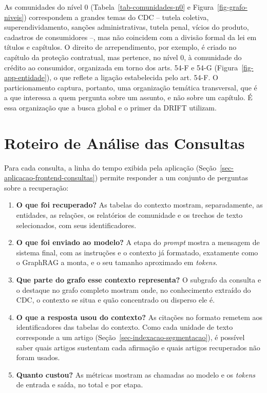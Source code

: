 As comunidades do nível 0 (Tabela~\ref{tab-comunidades-n0} e Figura~\ref{fig-grafo-niveis}) correspondem a grandes temas do CDC -- tutela coletiva, superendividamento, sanções administrativas, tutela penal, vícios do produto, cadastros de consumidores --, mas não coincidem com a divisão formal da lei em títulos e capítulos. O direito de arrependimento, por exemplo, é criado no capítulo da proteção contratual, mas pertence, no nível 0, à comunidade do crédito ao consumidor, organizada em torno dos arts. 54-F e 54-G (Figura~\ref{fig-app-entidade}), o que reflete a ligação estabelecida pelo art. 54-F. O particionamento captura, portanto, uma organização temática transversal, que é a que interessa a quem pergunta sobre um assunto, e não sobre um capítulo. É essa organização que a busca global e o primer da DRIFT utilizam.

\section{Roteiro de Análise das Consultas}
\label{sec-analise-roteiro}

Para cada consulta, a linha do tempo exibida pela aplicação (Seção~\ref{sec-aplicacao-frontend-consultas}) permite responder a um conjunto de perguntas sobre a recuperação:

\begin{enumerate}
    \item \textbf{O que foi recuperado?} As tabelas do contexto mostram, separadamente, as entidades, as relações, os relatórios de comunidade e os trechos de texto selecionados, com seus identificadores.
    \item \textbf{O que foi enviado ao modelo?} A etapa do \textit{prompt} mostra a mensagem de sistema final, com as instruções e o contexto já formatado, exatamente como o GraphRAG a monta, e o seu tamanho aproximado em \textit{tokens}.
    \item \textbf{Que parte do grafo esse contexto representa?} O subgrafo da consulta e o destaque no grafo completo mostram onde, no conhecimento extraído do CDC, o contexto se situa e quão concentrado ou disperso ele é.
    \item \textbf{O que a resposta usou do contexto?} As citações no formato  remetem aos identificadores das tabelas do contexto. Como cada unidade de texto corresponde a um artigo (Seção~\ref{sec-indexacao-segmentacao}), é possível saber quais artigos sustentam cada afirmação e quais artigos recuperados não foram usados.
    \item \textbf{Quanto custou?} As métricas mostram as chamadas ao modelo e os \textit{tokens} de entrada e saída, no total e por etapa.
\end{enumerate}

